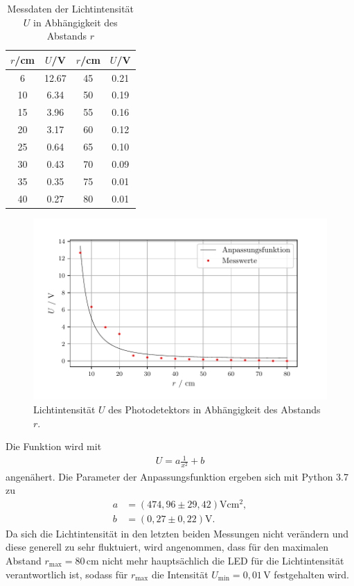 \begin{table}[H]
\centering
\caption{Messdaten der Lichtintensität $U$ in Abhängigkeit des Abstands $r$}
\label{tab:data4}
\begin{tabular}{c c c c}
\toprule
$r$\:/\:\si{\centi\meter}& $U$\:/\:\si{\volt} & $r$\:/\:\si{\centi\meter}& $U$\:/\:\si{\volt} \\
\midrule
6  & 12.67 & 45 & 0.21 \\
10 &  6.34 & 50 & 0.19 \\
15 &  3.96 & 55 & 0.16 \\
20 &  3.17 & 60 & 0.12 \\
25 &  0.64 & 65 & 0.10 \\
30 &  0.43 & 70 & 0.09 \\
35 &  0.35 & 75 & 0.01 \\
40 &  0.27 & 80 & 0.01 \\
\bottomrule
\end{tabular}
\end{table}

\begin{figure}[H]
  \centering
  \includegraphics{plot3.pdf}
  \caption{Lichtintensität $U$ des Photodetektors in Abhängigkeit des Abstands $r$.}
\end{figure}

Die Funktion wird mit
\begin{align*}
U = a \frac{1}{x^{2}} + b
\end{align*}
angenähert.
Die Parameter der Anpassungsfunktion ergeben sich mit Python 3.7 zu
\begin{align*}
a &= (474,96 \pm 29,42)\si{\volt\centi\meter\squared},\\
b &= (0,27 \pm 0,22)\si{\volt}.
\end{align*}
Da sich die Lichtintensität in den letzten beiden Messungen nicht verändern und
diese generell zu sehr fluktuiert, wird
angenommen, dass für den maximalen Abstand $r_\text{max} = 80\,\si{\centi\meter}$
nicht mehr hauptsächlich die LED für die Lichtintensität verantwortlich ist, sodass
für $r_\text{max}$ die Intensität $U_\text{min} = 0,01\,\si{\volt}$ festgehalten wird.